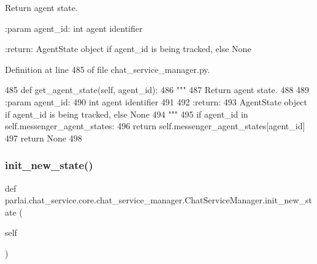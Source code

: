 \begin{DoxyVerb}Return agent state.

:param agent_id:
    int agent identifier

:return:
    AgentState object if agent_id is being tracked, else None
\end{DoxyVerb}
 

Definition at line 485 of file chat\+\_\+service\+\_\+manager.\+py.


\begin{DoxyCode}
485     \textcolor{keyword}{def }get\_agent\_state(self, agent\_id):
486         \textcolor{stringliteral}{"""}
487 \textcolor{stringliteral}{        Return agent state.}
488 \textcolor{stringliteral}{}
489 \textcolor{stringliteral}{        :param agent\_id:}
490 \textcolor{stringliteral}{            int agent identifier}
491 \textcolor{stringliteral}{}
492 \textcolor{stringliteral}{        :return:}
493 \textcolor{stringliteral}{            AgentState object if agent\_id is being tracked, else None}
494 \textcolor{stringliteral}{        """}
495         \textcolor{keywordflow}{if} agent\_id \textcolor{keywordflow}{in} self.messenger\_agent\_states:
496             \textcolor{keywordflow}{return} self.messenger\_agent\_states[agent\_id]
497         \textcolor{keywordflow}{return} \textcolor{keywordtype}{None}
498 
\end{DoxyCode}
\mbox{\label{classparlai_1_1chat__service_1_1core_1_1chat__service__manager_1_1ChatServiceManager_a4aa33c8155ac0850476037f8809c8f22}} 
\subsubsection{\texorpdfstring{init\+\_\+new\+\_\+state()}{init\_new\_state()}}
{\footnotesize\ttfamily def parlai.\+chat\+\_\+service.\+core.\+chat\+\_\+service\+\_\+manager.\+Chat\+Service\+Manager.\+init\+\_\+new\+\_\+state (\begin{DoxyParamCaption}\item[{}]{self }\end{DoxyParamCaption})}

